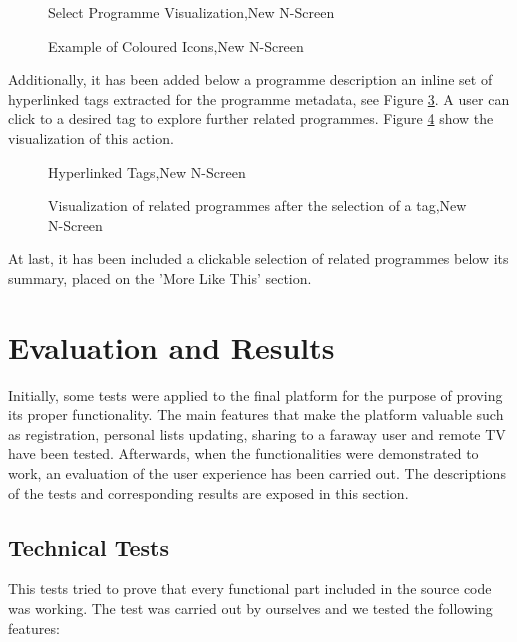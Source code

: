 \documentclass{acm_proc_article-sp}
\begin{document}
\begin{figure}[!htb]
\centering
{}
\caption{Select Programme Visualization,New N-Screen}
\label{fig:selectedprogramme}
\end{figure}

\begin{figure}[!htb]
\centering
{}
\caption{Example of Coloured Icons,New N-Screen}
\label{fig:colouredicons}
\end{figure}

Additionally, it has been added below a programme description an inline set of hyperlinked tags extracted for the programme metadata, see Figure \ref{fig:tags}. A user can click to a desired tag to explore further related programmes. Figure \ref{fig:tagsclick} show the visualization of this action. 

\begin{figure}[!htb]
\centering
{}
\caption{Hyperlinked Tags,New N-Screen}
\label{fig:tags}
\end{figure}

\begin{figure}[!htb]
\centering
{}
\caption{Visualization of related programmes after the selection of a tag,New N-Screen}
\label{fig:tagsclick}
\end{figure}

At last, it has been included a clickable selection of related programmes below its summary, placed on the 'More Like This' section. 

\section{Evaluation and Results}
Initially, some tests were applied to the final platform for the purpose of proving its
proper functionality. The main features that make the platform valuable such as
registration, personal lists updating, sharing to a faraway user and remote TV have been tested. Afterwards, when the functionalities were demonstrated to work, an evaluation of the user experience has been carried out. The descriptions of
the tests and corresponding results are exposed in this section.

\subsection{Technical Tests}
This tests tried to prove that every functional part included in the source code was working. The test was carried out by ourselves and we tested the following features:
\end{document}
